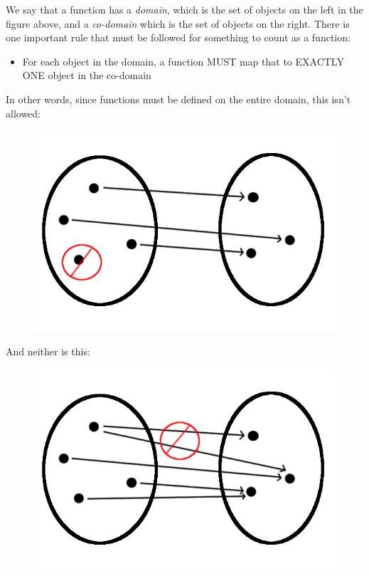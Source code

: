 \documentclass[UTF8]{book}
\begin{document}
\begin{CJK}{UTF8}{gbsn}
We say that a function has a \emph{domain}, which is the set of objects on the left in the figure above, and a \emph{co-domain} which is the set of objects on the right. There is one important rule that must be followed for something to count as a function:

\begin{itemize}
\item For each object in the domain, a function MUST map that to EXACTLY ONE object in the co-domain
\end{itemize}

In other words, since functions must be defined on the entire domain, this isn't allowed:

\begin{figure}[H]
\centering
\includegraphics[width=0.8\linewidth]{function_undefined}
\end{figure}

And neither is this:

\begin{figure}[H]
\centering
\includegraphics[width=0.8\linewidth]{function_multifunction}
\end{figure}


\end{CJK}
\end{document}
